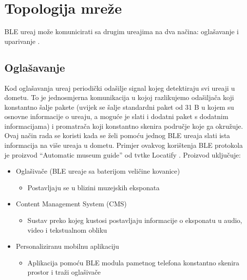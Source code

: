 \section{Topologija mre\v{z}e}

BLE ure\dj aj mo\v{z}e komunicirati sa drugim ure\dj ajima na dva na\v{c}ina: ogla\v{s}avanje i uparivanje \cite{ble_getting_started}.

\subsection{Ogla\v{s}avanje}

Kod ogla\v{s}avanja ure\dj aj periodi\v{c}ki oda\v{s}ilje signal kojeg detektiraju svi ure\dj aji u dometu. To je jednosmjerna komunikacija u kojoj razlikujemo oda\v{s}ilja\v{c}a koji konstantno \v{s}alje pakete (uvijek se \v{s}alje standardni paket od 31 B u kojem su osnovne informacije o ure\dj aju, a mogu\'{c}e je slati i dodatni paket s dodatnim informacijama) i promatra\v{c}a koji konstantno skenira podru\v{c}je koje ga okru\v{z}uje. Ovaj na\v{c}in rada se koristi kada se \v{z}eli pomo\'{c}u jednog BLE ure\dj aja slati ista informacija na vi\v{s}e ure\dj aja u dometu. Primjer ovakvog kori\v{s}tenja BLE protokola je proizvod ``Automatic museum guide'' od tvtke Locatify \cite{automatic_museum_guide} . Proizvod uklju\v{c}uje:


\begin{itemize}
	\item Ogla\v{s}iva\v{c}e (BLE ure\dj aje sa baterijom veli\v{c}ine kovanice)
	\begin{itemize}
		\item Postavljaju se u blizini muzejskih eksponata
	\end{itemize}
	\item Content Management System (CMS)
	\begin{itemize}
		\item Sustav preko kojeg kustosi postavljaju informacije o eksponatu u audio, video i tekstualnom obliku
	\end{itemize}
	
	\item Personaliziranu mobilnu aplikaciju
	\begin{itemize}
		\item Aplikacija pomo\'{c}u BLE modula pametnog telefona konstantno skenira prostor i tra\v{z}i ogla\v{s}iva\v{c}e
	\end{itemize}
\end{itemize}

